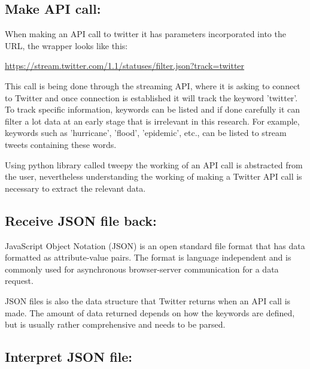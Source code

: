 \subsection{Make API call:}

When making an API call to twitter it has parameters incorporated into the URL, the wrapper looks like this:

\hfill

\url{https://stream.twitter.com/1.1/statuses/filter.json?track=twitter}

\hfill

This call is being done through the streaming API, where it is asking to connect to Twitter and once connection is established it will track the keyword 'twitter'. To track specific information,  keywords can be listed and if done carefully it can filter a lot data at an early stage that is irrelevant in this research. For example, keywords such as 'hurricane', 'flood', 'epidemic', etc., can be listed to stream tweets containing these words.

Using  python library called tweepy the working of an API call is abstracted from the user, nevertheless understanding the working of making a Twitter API call is necessary to extract the relevant data.

%

\subsection{Receive JSON file back:}

JavaScript Object Notation (JSON) is an open standard file format that has data formatted as attribute-value pairs. The format is language independent and is commonly used for asynchronous browser-server communication for a data request.

JSON files is also the data structure that Twitter returns when an API call is made. The amount of data returned depends on how the keywords are defined, but is usually rather comprehensive and needs to be parsed.

\subsection{Interpret JSON file:}

